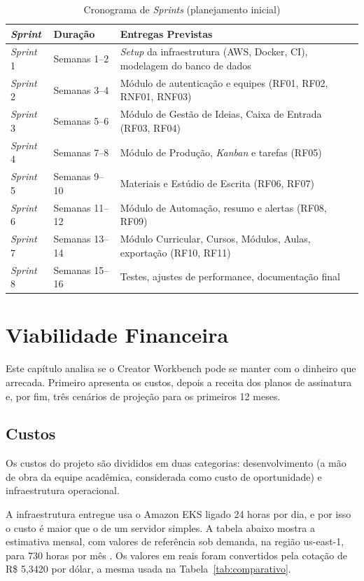 \begin{table}[H]
\centering
\caption{Cronograma de \textit{Sprints} (planejamento inicial)}
\label{tab:cronograma}
\begin{tabular}{|l|l|p{8cm}|}
\hline
\textbf{\textit{Sprint}} & \textbf{Duração} & \textbf{Entregas Previstas} \\
\hline
\textit{Sprint} 1 & Semanas 1--2 & \textit{Setup} da infraestrutura (AWS, Docker, CI), modelagem do banco de dados \\
\hline
\textit{Sprint} 2 & Semanas 3--4 & Módulo de autenticação e equipes (RF01, RF02, RNF01, RNF03) \\
\hline
\textit{Sprint} 3 & Semanas 5--6 & Módulo de Gestão de Ideias, Caixa de Entrada (RF03, RF04) \\
\hline
\textit{Sprint} 4 & Semanas 7--8 & Módulo de Produção, \textit{Kanban} e tarefas (RF05) \\
\hline
\textit{Sprint} 5 & Semanas 9--10 & Materiais e Estúdio de Escrita (RF06, RF07) \\
\hline
\textit{Sprint} 6 & Semanas 11--12 & Módulo de Automação, resumo e alertas (RF08, RF09) \\
\hline
\textit{Sprint} 7 & Semanas 13--14 & Módulo Curricular, Cursos, Módulos, Aulas, exportação (RF10, RF11) \\
\hline
\textit{Sprint} 8 & Semanas 15--16 & Testes, ajustes de performance, documentação final \\
\hline
\end{tabular}
\end{table}

\chapter{Viabilidade Financeira}

Este capítulo analisa se o Creator Workbench pode se manter com o dinheiro que arrecada. Primeiro apresenta os custos, depois a receita dos planos de assinatura e, por fim, três cenários de projeção para os primeiros 12 meses.

\section{Custos}

Os custos do projeto são divididos em duas categorias: desenvolvimento (a mão de obra da equipe acadêmica, considerada como custo de oportunidade) e infraestrutura operacional.

A infraestrutura entregue usa o Amazon EKS ligado 24 horas por dia, e por isso o custo é maior que o de um servidor simples. A tabela abaixo mostra a estimativa mensal, com valores de referência sob demanda, na região us-east-1, para 730 horas por mês \cite{aws2026}. Os valores em reais foram convertidos pela cotação de R\$ 5,3420 por dólar, a mesma usada na Tabela~\ref{tab:comparativo}.

